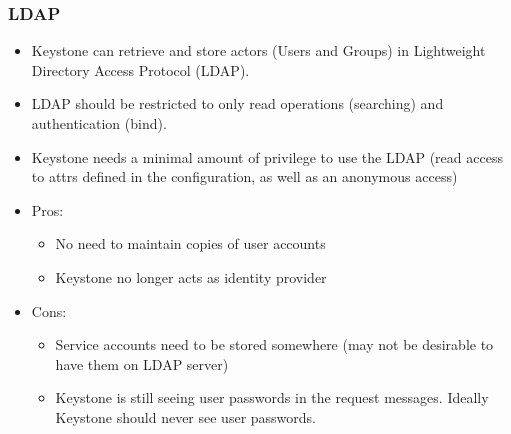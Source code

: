 \documentclass{article}
\begin{document}
\subsubsection{LDAP}
\begin{itemize}
    \item Keystone can retrieve and store actors (Users and Groups) in Lightweight Directory Access Protocol (LDAP).
    
    \item LDAP should be restricted to only read operations (searching) and authentication (bind). 
    
    \item Keystone needs a minimal amount of privilege to use the LDAP (read access to attrs defined in the configuration, as well as an anonymous access)
    
    \item Pros:
    \begin{itemize}
        \item No need to maintain copies of user accounts
        
        \item Keystone no longer acts as identity provider
    \end{itemize}
    
    \item Cons:
    \begin{itemize}
        \item Service accounts need to be stored somewhere (may not be desirable to have them on LDAP server)
        
        \item Keystone is still seeing user passwords in the request messages. Ideally Keystone should never see user passwords. 
    \end{itemize}
\end{itemize}
\end{document}
